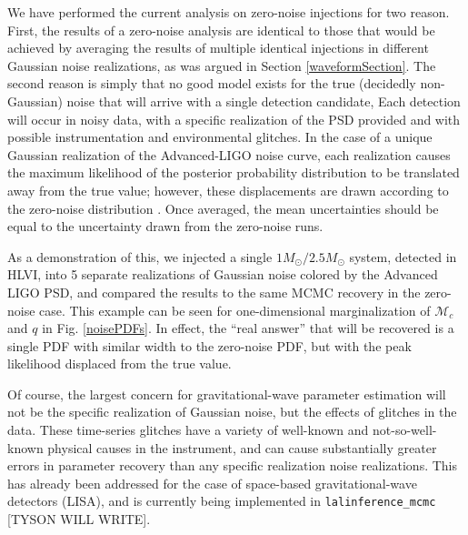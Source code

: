 \documentclass[11pt,a4paper]{emulateapj}
\newcommand{\carl}[1]{{\color{red}  #1}}
\newcommand{\chmass}{\mathcal{M}_c}
\begin{document}
  

We have performed the current analysis on zero-noise injections for two reason.  First, the results of a zero-noise 
analysis are identical to those that would be achieved by averaging the results of multiple identical injections 
in different Gaussian noise realizations, as was argued in Section \ref{waveformSection}.  The second reason is simply
that no good model exists for the true (decidedly non-Gaussian) noise that will arrive with a single detection candidate,
Each detection will occur in noisy data, with a specific realization of the PSD provided and with 
possible instrumentation and environmental glitches.  In the case of a unique Gaussian realization
of the Advanced-LIGO noise curve, each realization causes the maximum likelihood of the posterior probability 
distribution to be translated away from the true value; however, these displacements are drawn
according to the zero-noise distribution \citep{Inadequacies}.  Once averaged, the mean
uncertainties should be equal to the uncertainty drawn from the zero-noise runs.  

As a demonstration of this, we injected a single $1M_{\odot}/2.5M_{\odot}$ system, 
detected in HLVI,  into 5 separate realizations of Gaussian noise colored by the Advanced LIGO PSD, 
and compared the results to the same MCMC recovery in the zero-noise case.  This example
can be seen for one-dimensional marginalization of $\chmass$ and $q$ in Fig. \ref{noisePDFs}.  In effect, the ``real answer'' that will be recovered is a single PDF with similar 
width to the zero-noise PDF, but with the peak likelihood displaced from the true value.  

Of course, the largest concern for gravitational-wave parameter estimation will not be the specific
realization of Gaussian noise, but the effects of glitches in the data.  These time-series 
glitches have a variety of well-known and not-so-well-known physical causes in the instrument,
and can cause substantially greater errors in parameter recovery than any specific realization noise realizations.  This has already been addressed for the case of space-based gravitational-wave
detectors (LISA), and is currently being implemented in \texttt{lalinference\_mcmc} 
\carl{[TYSON WILL WRITE]}.
\end{document}
